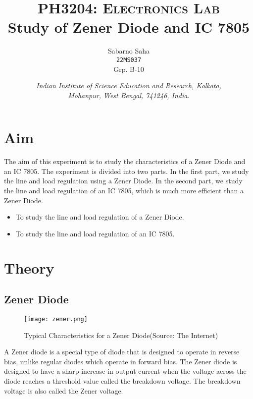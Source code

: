 \documentclass{scrartcl}
\title{
        \Large\textsc{PH3204: Electronics Lab} \\
        \vspace{10pt}
        \Huge \textbf{Study of Zener Diode and IC 7805} \\
}
\author{Sabarno Saha \\ \texttt{22MS037} \\ Grp. B-10}
\date{\normalsize
        \textit{Indian Institute of Science Education and Research, Kolkata, \\
        Mohanpur, West Bengal, 741246, India.}
}
\newcommand{\1}{\mathbbm{1}}
\begin{document}
\maketitle
\tableofcontents
\newpage
\section{Aim}

The aim of this experiment is to study the characteristics of a Zener Diode and an IC 7805. 
The experiment is divided into two parts. In the first part, we study the line and load regulation 
using a Zener Diode. In the second part, we study the line and load regulation of an IC 7805, which 
is much more efficient than a Zener Diode.

\begin{itemize}
	\item To study the line and load regulation of a Zener Diode.
	\item To study the line and load regulation of an IC 7805.
\end{itemize}

\section{Theory}
\subsection{Zener Diode}
\begin{figure}[H]
	\centering
	\texttt{[image: zener.png]}
	\caption{Typical Characteristics for a Zener Diode(Source: The Internet)}
\end{figure}
A Zener diode is a special type of diode that is designed to operate in reverse bias, unlike 
regular diodes which operate in forward bias. The Zener diode is designed to have a sharp 
increase in output current when the voltage across the diode reaches a threshold value called 
the breakdown voltage. The breakdown voltage is also called the Zener voltage.
\end{document}
